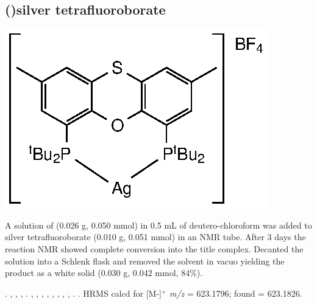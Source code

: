 

\subsection*{(\tBuThixantphos)silver tetrafluoroborate}

\begin{structure}[h]
\begin{center}
\includegraphics{../Structures/StBuSilverBF4.eps}
\end{center}
\end{structure}

A solution of \tButhixantphos{} (0.026 g, 0.050 mmol) in 0.5 mL of deutero-chloroform was added to silver tetrafluoroborate (0.010 g, 0.051 mmol) in an NMR tube.  After 3 days the reaction NMR showed complete conversion into the title complex.  Decanted the solution into a Schlenk flask and removed the solvent in vacuo yielding the product as a white solid (0.030 g, 0.042 mmol, 84\%).

.
,
,
,
.
,
,
,
,
,
, %
,
,
.
.
HRMS calcd for  [M-]$^+$ \emph{m/z} = 623.1796; found = 623.1826.

